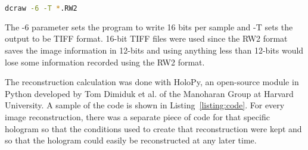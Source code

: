 \begin{center}
\begin{lstlisting}[frame=none, language=bash, numbers=none]
dcraw -6 -T *.RW2
\end{lstlisting}
\end{center}
The -6 parameter sets the program to write 16 bits per sample and
-T sets the output to be TIFF format.
16-bit TIFF files were used since the RW2 format saves the image information in
12-bits
and using
anything less than 12-bits would lose some information recorded using the RW2
format.

The reconstruction calculation was done with HoloPy,
an open-source module in Python developed by Tom Dimiduk et al.\cite{Manoharan} of the Manoharan Group at
Harvard University. A sample of the code is shown in
Listing~\ref{listing:code}. For every image reconstruction, there was a separate
piece of code for that specific hologram so that the conditions used to create
that reconstruction were kept and so that the hologram could easily be
reconstructed at any later time.



